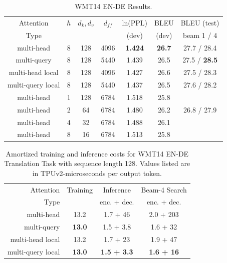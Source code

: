 \documentclass{article}
\begin{document}
\begin{table}[h]
\caption{WMT14 EN-DE Results.}
\label{tab:translation}
\begin{center}
\begin{tabular}{cccc|cc|c}
\hline\rule{0pt}{2.0ex}
Attention & $h$ & $d_k, d_v$ & $d_{ff}$ &  ln(PPL) & BLEU & BLEU (test)\\
Type & & & & (dev) & (dev) & beam 1 / 4\\

\hline
multi-head & 8 & 128 & 4096 &  \textbf{1.424} & \textbf{26.7} & 27.7 / 28.4\\
multi-query & 8 & 128 & 5440 &  1.439 & 26.5 & 27.5 / \textbf{28.5}\\
multi-head local & 8 & 128 & 4096  & 1.427 & 26.6 & 27.5 / 28.3 \\
multi-query local & 8 & 128 & 5440 & 1.437 & 26.5 & 27.6 / 28.2 \\
\hline
multi-head & 1 & 128 & 6784 & 1.518 & 25.8 \\
multi-head & 2 & 64 & 6784 & 1.480 & 26.2 & 26.8 / 27.9\\
multi-head & 4 & 32 & 6784 & 1.488 & 26.1 \\
multi-head & 8 & 16 & 6784 & 1.513 &  25.8\\
\hline
\end{tabular}
\end{center}
\end{table}


\begin{table}[h]
\caption{Amortized training and inference costs for WMT14 EN-DE Translation Task with sequence length 128.  Values listed are in TPUv2-microseconds per output token.}
\label{tab:translation2}
\begin{center}
\begin{tabular}{r|c|c|c}
\hline\rule{0pt}{2.0ex}
Attention & Training & Inference  & Beam-4 Search \\
Type & & enc. + dec. & enc. + dec. \\

\hline
multi-head  & 13.2 & 1.7 + 46 & 2.0 + 203 \\
multi-query & \textbf{13.0} & 1.5 + 3.8 & 1.6 + 32 \\

multi-head local  & 13.2 & 1.7 + 23 & 1.9 + 47 \\
multi-query local & \textbf{13.0} & \textbf{1.5 + 3.3} & \textbf{1.6 + 16} \\
\hline
\end{tabular}
\end{center}
\end{table}
\end{document}
